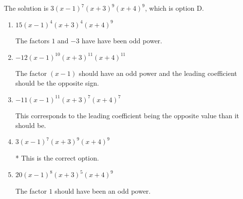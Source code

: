 \documentclass{extbook}[14pt]
\begin{document}
\begin{enumerate}
{The solution is \( 3(x - 1)^{7} (x + 3)^{9} (x + 4)^{9} \), which is option D.\begin{enumerate}[label=\Alph*.]
\item \( 15(x - 1)^{4} (x + 3)^{4} (x + 4)^{9} \)

The factors $1$ and $-3$ have have been odd power.
\item \( -12(x - 1)^{10} (x + 3)^{11} (x + 4)^{11} \)

The factor $(x - 1)$ should have an odd power and the leading coefficient should be the opposite sign.
\item \( -11(x - 1)^{11} (x + 3)^{7} (x + 4)^{7} \)

This corresponds to the leading coefficient being the opposite value than it should be.
\item \( 3(x - 1)^{7} (x + 3)^{9} (x + 4)^{9} \)

* This is the correct option.
\item \( 20(x - 1)^{8} (x + 3)^{5} (x + 4)^{9} \)

The factor $1$ should have been an odd power.
\end{enumerate}

}
\end{enumerate}
\end{document}
